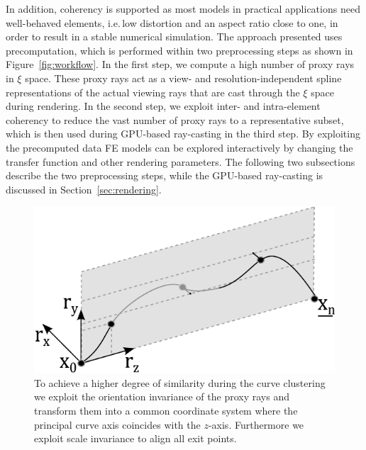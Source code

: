 \documentclass[journal]{vgtc}                %
\begin{document}
In addition, coherency is supported as most models in practical applications need well-behaved elements, i.e.\,low distortion and an aspect ratio close to one, in order to result in a stable numerical simulation. The approach presented uses precomputation, which is performed within two preprocessing steps as shown in Figure~\ref{fig:workflow}. In the first step, we compute a high number of proxy rays in $\xi$ space. These proxy rays act as a view- and resolution-independent spline representations of the actual viewing rays that are cast through the $\xi$ space during rendering. In the second step, we exploit inter- and intra-element coherency to reduce the vast number of proxy rays to a representative subset, which is then used during GPU-based ray-casting in the third step. By exploiting the precomputed data FE models can be explored interactively by changing the transfer function and other rendering parameters. The following two subsections describe the two preprocessing steps, while the GPU-based ray-casting is discussed in Section~\ref{sec:rendering}.
%
\begin{figure}[b]
	\centering
	\includegraphics[width=0.75\linewidth]{figures/splinetransformation_new}
	\caption{To achieve a higher degree of similarity during the curve clustering we exploit the orientation invariance of the proxy rays and transform them into a common coordinate system where the principal curve axis coincides with the $z$-axis. Furthermore we exploit scale invariance to align all exit points.}
	\label{fig:proxyrayalignment}
\end{figure}
%
%
%
\end{document}

